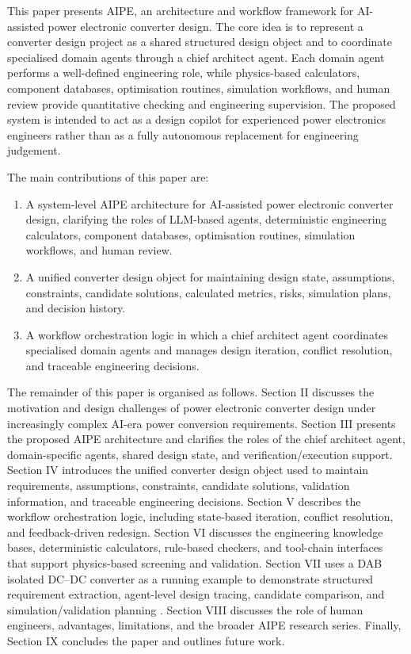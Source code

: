 This paper presents AIPE, an architecture and workflow framework for AI-assisted power electronic converter design. The core idea is to represent a converter design project as a shared structured design object and to coordinate specialised domain agents through a chief architect agent. Each domain agent performs a well-defined engineering role, while physics-based calculators, component databases, optimisation routines, simulation workflows, and human review provide quantitative checking and engineering supervision. The proposed system is intended to act as a design copilot for experienced power electronics engineers rather than as a fully autonomous replacement for engineering judgement.

The main contributions of this paper are:
\begin{enumerate}
\item A system-level AIPE architecture for AI-assisted power electronic converter design, clarifying the roles of LLM-based agents, deterministic engineering calculators, component databases, optimisation routines, simulation workflows, and human review.
\item A unified converter design object for maintaining design state, assumptions, constraints, candidate solutions, calculated metrics, risks, simulation plans, and decision history.
\item A workflow orchestration logic in which a chief architect agent coordinates specialised domain agents and manages design iteration, conflict resolution, and traceable engineering decisions.
\end{enumerate}

The remainder of this paper is organised as follows. Section II discusses the motivation and design challenges of power electronic converter design under increasingly complex AI-era power conversion requirements. Section III presents the proposed AIPE architecture and clarifies the roles of the chief architect agent, domain-specific agents, shared design state, and verification/execution support. Section IV introduces the unified converter design object used to maintain requirements, assumptions, constraints, candidate solutions, validation information, and traceable engineering decisions. Section V describes the workflow orchestration logic, including state-based iteration, conflict resolution, and feedback-driven redesign. Section VI discusses the engineering knowledge bases, deterministic calculators, rule-based checkers, and tool-chain interfaces that support physics-based screening and validation. Section VII uses a DAB isolated DC--DC converter as a running example to demonstrate structured requirement extraction, agent-level design tracing, candidate comparison, and simulation/validation planning \cite{11283728}. Section VIII discusses the role of human engineers, advantages, limitations, and the broader AIPE research series. Finally, Section IX concludes the paper and outlines future work.
